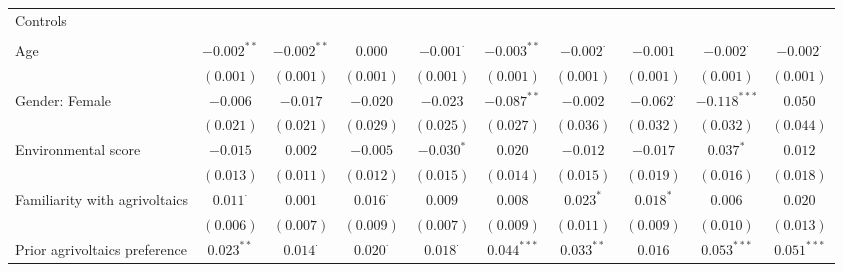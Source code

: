 \begin{center}
\begin{small}
\begin{longtable}{l@{} c@{} c@{} c@{} c@{} c@{} c@{} c@{} c@{} c@{}}
Controls                            &                 &                 &                 &                  &               &                  &                  &                  &                  \\
                                    &                 &                 &                 &                  &               &                  &                  &                  &                  \\
\quad Age                           & $-0.002^{**}$   & $-0.002^{**}$   & $0.000$         & $-0.001^{\cdot}$ & $-0.003^{**}$ & $-0.002^{\cdot}$ & $-0.001$         & $-0.002^{\cdot}$ & $-0.002^{\cdot}$ \\
                                    & $(0.001)$       & $(0.001)$       & $(0.001)$       & $(0.001)$        & $(0.001)$     & $(0.001)$        & $(0.001)$        & $(0.001)$        & $(0.001)$        \\
\quad Gender: Female                & $-0.006$        & $-0.017$        & $-0.020$        & $-0.023$         & $-0.087^{**}$ & $-0.002$         & $-0.062^{\cdot}$ & $-0.118^{***}$   & $0.050$          \\
                                    & $(0.021)$       & $(0.021)$       & $(0.029)$       & $(0.025)$        & $(0.027)$     & $(0.036)$        & $(0.032)$        & $(0.032)$        & $(0.044)$        \\
\quad Environmental score           & $-0.015$        & $0.002$         & $-0.005$        & $-0.030^{*}$     & $0.020$       & $-0.012$         & $-0.017$         & $0.037^{*}$      & $0.012$          \\
                                    & $(0.013)$       & $(0.011)$       & $(0.012)$       & $(0.015)$        & $(0.014)$     & $(0.015)$        & $(0.019)$        & $(0.016)$        & $(0.018)$        \\
\quad Familiarity with agrivoltaics & $0.011^{\cdot}$ & $0.001$         & $0.016^{\cdot}$ & $0.009$          & $0.008$       & $0.023^{*}$      & $0.018^{*}$      & $0.006$          & $0.020$          \\
                                    & $(0.006)$       & $(0.007)$       & $(0.009)$       & $(0.007)$        & $(0.009)$     & $(0.011)$        & $(0.009)$        & $(0.010)$        & $(0.013)$        \\
\quad Prior agrivoltaics preference & $0.023^{**}$    & $0.014^{\cdot}$ & $0.020^{\cdot}$ & $0.018^{\cdot}$  & $0.044^{***}$ & $0.033^{**}$     & $0.016$          & $0.053^{***}$    & $0.051^{***}$    \\

\end{longtable}
\end{small}
\end{center}
